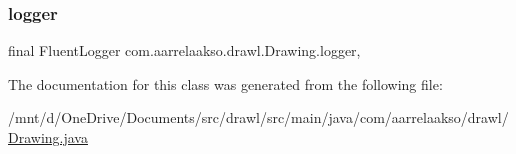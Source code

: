 \subsubsection{\texorpdfstring{logger}{logger}}
{\footnotesize\ttfamily final Fluent\+Logger com.\+aarrelaakso.\+drawl.\+Drawing.\+logger\hspace{0.3cm}{\ttfamily [static]}, {\ttfamily [private]}}



The documentation for this class was generated from the following file\+:\begin{DoxyCompactItemize}
\item 
/mnt/d/\+One\+Drive/\+Documents/src/drawl/src/main/java/com/aarrelaakso/drawl/\hyperlink{_drawing_8java}{Drawing.\+java}\end{DoxyCompactItemize}
